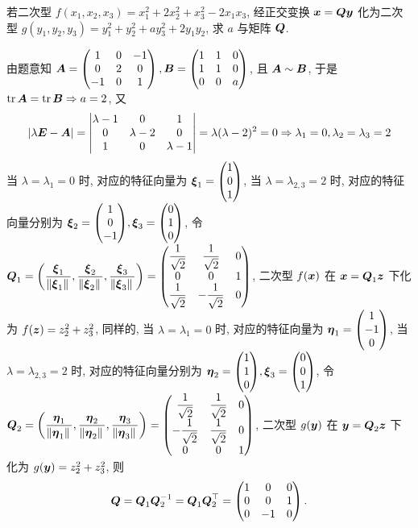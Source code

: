 \begin{example}
    若二次型 $f(x_1, x_2, x_3)=x_1^2+2x_2^2+x_3^2-2x_1x_3$, 经正交变换 $\vb*{x}=\vb*{Qy}$ 化为二次型 $g(y_1, y_2, y_3)=y_1^2+y_2^2+ay_3^2+2y_1y_2$, 求 $a$ 与矩阵 $\vb*{Q}$.
\end{example}
\begin{solution}
    由题意知 $\vb*{A}=\begin{pmatrix} 1 & 0 & -1 \\ 0 & 2 & 0 \\ -1 & 0 & 1 \\\end{pmatrix}, \vb*{B}=\begin{pmatrix} 1 & 1 & 0 \\ 1 & 1 & 0 \\ 0 & 0 & a \\\end{pmatrix}$, 且 $\vb*{A}\sim \vb*{B}$, 于是 $\tr\vb*{A}=\tr\vb*{B}\Rightarrow a=2$, 又
    $$
        |\lambda\vb*{E}-\vb*{A}|=\mqty|\lambda-1 & 0 & 1 \\ 0 & \lambda-2 & 0 \\ 1 & 0 & \lambda-1 |=\lambda(\lambda-2)^2=0\Rightarrow \lambda_1=0,\lambda_2=\lambda_3=2
    $$
    当 $\lambda=\lambda_1=0$ 时, 对应的特征向量为 $\vb*{\xi}_1=\mqty(1\\0\\1)$, 当 $\lambda=\lambda_{2,3}=2$ 时, 对应的特征向量分别为
    $\vb*{\xi}_2=\mqty(1\\0\\-1),\vb*{\xi}_3=\mqty(0\\1\\0)$, 令 $\vb*{Q}_1=\qty(\dfrac{\vb*{\xi}_1}{\norm*{\vb*{\xi}_1}},\dfrac{\vb*{\xi}_2}{\norm*{\vb*{\xi}_2}},\dfrac{\vb*{\xi}_3}{\norm*{\vb*{\xi}_3}})=\mqty(\dfrac{1}{\sqrt{2}}&\dfrac{1}{\sqrt{2}}&0\\ 0&0&1\\ \dfrac{1}{\sqrt{2}}&-\dfrac{1}{\sqrt{2}}&0)$, 二次型 $f(\vb*{x})$ 在 $\vb*{x}=\vb*{Q}_1\vb*{z}$ 下化为 $f(\vb*{z})=z_2^2+z_3^2$, 同样的, 当 $\lambda=\lambda_1=0$ 时, 对应的特征向量为 $\vb*{\eta}_1=\mqty(1\\-1\\0)$, 当 $\lambda=\lambda_{2,3}=2$ 时, 对应的特征向量分别为 $\vb*{\eta}_2=\mqty(1\\1\\0),\vb*{\xi}_3=\mqty(0\\0\\1)$, 令 $\vb*{Q}_2=\qty(\dfrac{\vb*{\eta}_1}{\norm*{\vb*{\eta}_1}},\dfrac{\vb*{\eta}_2}{\norm*{\vb*{\eta}_2}},\dfrac{\vb*{\eta}_3}{\norm*{\vb*{\eta}_3}})=\mqty(\dfrac{1}{\sqrt{2}}&\dfrac{1}{\sqrt{2}}&0\\[6pt]-\dfrac{1}{\sqrt{2}}&\dfrac{1}{\sqrt{2}}&0\\0&0&1)$, 二次型 $g(\vb*{y})$ 在 $\vb*{y}=\vb*{Q}_2\vb*{z}$ 下化为 $g(\vb*{y})=z_2^2+z_3^2$, 则
    $$\vb*{Q}=\vb*{Q}_1\vb*{Q}_2^{-1}=\vb*{Q}_1\vb*{Q}_2^\top=\begin{pmatrix} 1 & 0 & 0 \\ 0 & 0 & 1 \\ 0 & -1 & 0 \\\end{pmatrix}.$$
\end{solution}

